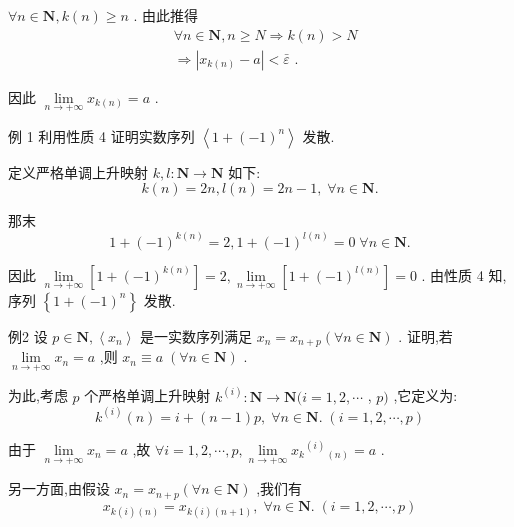 $\forall n \in  \mathbf{N},k\left( n\right)  \geq  n$ . 由此推得
\begin{align*}
	&\forall n \in  \mathbf{N},n \geq  N \Rightarrow  k\left( n\right)  > N\\
	&\Rightarrow  \left| {{x}_{k\left( n\right) } - a}\right|  < \bar{\varepsilon }\text{ . }
\end{align*}

因此 $\mathop{\lim }\limits_{{n \rightarrow   + \infty }}{x}_{k\left( n\right) } = a$ .

例 1 利用性质 4 证明实数序列 $\left\langle  {1 + {\left( -1\right) }^{n}}\right\rangle$ 发散.

定义严格单调上升映射 $k,l : \mathbf{N} \rightarrow  \mathbf{N}$ 如下:
$$k\left( n\right)  = {2n},l\left( n\right)  = {2n} - 1,\;\forall n \in  \mathbf{N}.$$

那末
$$1 + {\left( -1\right) }^{k\left( n\right) } = 2,1 + {\left( -1\right) }^{l\left( n\right) } = 0\;\forall n \in  \mathbf{N}.$$

因此 $\mathop{\lim }\limits_{{n \rightarrow   + \infty }}\left\lbrack  {1 + {\left( -1\right) }^{k\left( n\right) }}\right\rbrack   = 2,\mathop{\lim }\limits_{{n \rightarrow   + \infty }}\left\lbrack  {1 + {\left( -1\right) }^{l\left( n\right) }}\right\rbrack   = 0$ . 由性质 4 知,序列 $\left\{  {1 + {\left( -1\right) }^{n}}\right\}$ 发散.

例2 设 $p \in  \mathbf{N},\left\langle  {x}_{n}\right\rangle$ 是一实数序列满足 ${x}_{n} = {x}_{n + p}\left( {\forall n \in  \mathbf{N}}\right)$ . 证明,若 $\mathop{\lim }\limits_{{n \rightarrow   + \infty }}{x}_{n} = a$ ,则 ${x}_{n} \equiv  a\;\left( {\forall n \in  \mathbf{N}}\right)$ .

为此,考虑 $p$ 个严格单调上升映射 ${k}^{\left( i\right) } : \mathbf{N} \rightarrow  \mathbf{N}(i = 1,2,\cdots$ , $p)$ ,它定义为:
$${k}^{\left( i\right) }\left( n\right)  = i + \left( {n - 1}\right) p,\;\forall n \in  \mathbf{N}.\;\left( {i = 1,2,\cdots ,p}\right)$$

由于 $\mathop{\lim }\limits_{{n \rightarrow   + \infty }}{x}_{n} = a$ ,故 $\forall i = 1,2,\cdots ,p,\mathop{\lim }\limits_{{n \rightarrow   + \infty }}{x}_{k}{}^{\left( i\right) }{}_{\left( n\right) } = a$ .

另一方面,由假设 ${x}_{n} = {x}_{n + p}\left( {\forall n \in  \mathbf{N}}\right)$ ,我们有
$${x}_{k\left( i\right) \left( n\right) } = {x}_{k\left( i\right) \left( {n + 1}\right) },\;\forall n \in  \mathbf{N}.\;\left( {i = 1,2,\cdots ,p}\right)$$

